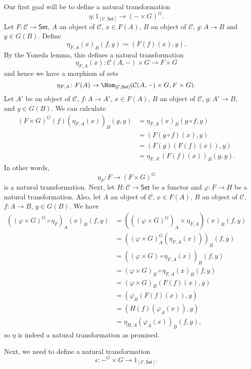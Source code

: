 Our first goal will be to define a natural transformation
\[ \eta\colon 1_{[\mathcal{C}, \mathsf{Set}]}\to ({-}\times G)^G. \]
Let $F\colon \mathcal{C}\to \mathsf{Set}$, $A$ an object of $\mathcal{C}$, $x \in F(A)$,
$B$ an object of $\mathcal{C}$, $g\colon A\to B$ and $y \in G(B)$. Define
\[ \eta_{F, A}(x)_B(f, y)\coloneqq (F(f)(x), y). \]
By the Yoneda lemma, this defines a natural transformation
\[ \eta_{F, A}(x) \colon \mathcal{C}(A, {-})\times G \to F\times G \]
and hence we have a morphism of sets
\[ \eta_{F, A}\colon F(A)\to \Hom_{[\mathcal{C}, \mathsf{Set}]}(\mathcal{C}(A, {-})\times G, F\times G). \]
Let $A'$ be an object of $\mathcal{C}$, $f\colon A\to A'$,
$x \in F(A)$, $B$ an object of $\mathcal{C}$, $g\colon A'\to B$, and $y \in G(B)$.
We can calculate
\begin{align*}
	(F\times G)^G(f)(\eta_{F, A}(x))_B(g, y) &= \eta_{F, A}(x)_B(g \circ f, y)\\
	&= (F(g \circ f)(x), y)\\
	&= (F(g)(F(f)(x)), y)\\
	&= \eta_{F, A'}(F(f)(x))_B(g, y).
\end{align*}
In other words,
\[ \eta_F\colon F\to (F\times G)^G \]
is a natural transformation. Next, let $H\colon \mathcal{C}\to \mathsf{Set}$ be
a functor and $\varphi\colon F\to H$ be a natural transformation. Also, let
$A$ an object of $\mathcal{C}$, $x \in F(A)$, $B$ an object of $\mathcal{C}$,
$f\colon A\to B$, $y \in G(B)$. We have
\begin{align*}
	((\varphi\times G)^G \circ \eta_F)_A(x)_B(f, y)
	&= (((\varphi\times G)^G)_A\times \eta_{F, A})(x)_B(f, y)\\
	&= ((\varphi\times G)^G_A(\eta_{F, A}(x)))_B(f, y)\\
	&= ((\varphi\times G) \circ \eta_{F, A}(x))_B(f, y)\\
	&= (\varphi\times G)_B \circ \eta_{F, A}(x)_B(f, y)\\
	&= (\varphi\times G)_B(F(f)(x), y)\\
	&= (\varphi_B(F(f)(x)), y)\\
	&= (H(f)(\varphi_A(x)), y)\\
	&= \eta_{H, A}(\varphi_A(x))_B(f, y),
\end{align*}
so $\eta$ is indeed a natural transformation as promised.

Next, we need to define a natural transformation
\[ \epsilon\colon {-}^G\times G\to 1_{[\mathcal{C}, \mathsf{Set}]}. \]

